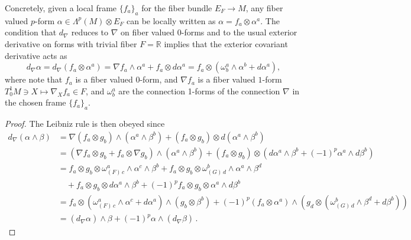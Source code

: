 \documentclass[../geometry_main.tex]{subfiles}
\begin{document}
\begin{mytheorem}
Concretely, given a local frame $\{f_a\}_a$ for the fiber bundle $E_F \to M$, any fiber valued $p$-form $\alpha \in \Lambda^p (M) \otimes E_F$ can be locally written as $\alpha = f_a\otimes \alpha^a$.
The condition that $d_\nabla$ reduces to $\nabla$ on fiber valued $0$-forms and to the usual exterior derivative on forms with trivial fiber $F = \mathbb{R}$ implies that the exterior covariant derivative acts as
\begin{equation}
    d_\nabla \alpha = d_\nabla ( f_a\otimes \alpha^a)= \nabla f_a \wedge \alpha^a + f_a \otimes d \alpha^a  
    = f_a\otimes\left( \omega^a_{b} \wedge \alpha^b + d \alpha^a \right),
\end{equation}
where note that $f_a$ is a fiber valued $0$-form, and $\nabla f_a$ is a fiber valued $1$-form $T^1_0M\ni X \mapsto \nabla_X f_a \in F$, and $\omega^a_{b}$ are the connection 1-forms of the connection $\nabla$ in the chosen frame $\{f_a\}_a$.
\smallskip
\begin{proof}
The Leibniz rule is then obeyed since
\begin{align}
    d_\nabla(\alpha \wedge \beta) 
    &= \nabla (f_a\otimes g_b) \wedge (\alpha^a \wedge \beta^b) + (f_a\otimes g_b) \otimes d(\alpha^a \wedge \beta^b) \\
    &= \left( \nabla f_a \otimes g_b + f_a \otimes \nabla g_b \right) \wedge (\alpha^a \wedge \beta^b) +
    (f_a\otimes g_b) \otimes \left( d \alpha^a \wedge \beta^b + (-1)^p \alpha^a \wedge d \beta^b \right)
    \\
    &= f_a \otimes g_b \otimes \omega^a_{(F)\,c} \wedge \alpha^c \wedge \beta^b + f_a \otimes g_b \otimes \omega^b_{(G)\,d} \wedge \alpha^a \wedge \beta^d \\
    &\quad + f_a \otimes g_b \otimes d \alpha^a \wedge \beta^b + (-1)^p f_a \otimes g_b \otimes \alpha^a \wedge d \beta^b
    \\
    &= f_a\otimes\left( \omega^a_{(F)\,c} \wedge \alpha^c + d \alpha^a \right) \wedge (g_b \otimes \beta^b) + (-1)^p (f_a \otimes \alpha^a) \wedge \left( g_d \otimes \left( \omega^b_{(G)\,d} \wedge \beta^d + d \beta^b \right) \right)\\
    &=(d_\nabla \alpha) \wedge \beta + (-1)^p \alpha \wedge (d_\nabla \beta)\,.
\end{align}
\end{proof}
\end{mytheorem}
\end{document}
